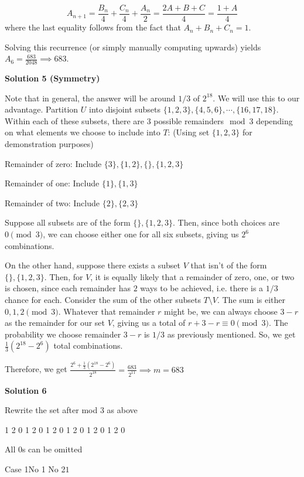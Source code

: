 \begin{enumerate}
 
 \[A_{n+1} = \frac{B_n}{4} + \frac{C_n}{4} + \frac{A_n}{2} = \frac{2A+B+C}{4} = \frac{1+A}{4}\]where the last equality follows from the fact that $A_n+B_n+C_n = 1.$

 Solving this recurrence (or simply manually computing upwards) yields $A_6 = \frac{683}{2048} \implies \boxed{683}$.

 



\textbf{Solution 5 (Symmetry)}

Note that in general, the answer will be around $1/3$ of $2^{18}$. We will use this to our advantage. Partition $U$ into disjoint subsets $\{1,2,3\}, \{4,5,6\}, \cdots, \{16,17,18\}$. Within each of these subsets, there are 3 possible remainders$\mod 3$ depending on what elements we choose to include into $T$: (Using set $\{1,2,3\}$ for demonstration purposes) 

 Remainder of zero: Include $\{3\}, \{1,2\}, \{\}, \{1,2,3\}$

 Remainder of one: Include $\{1\}, \{1,3\}$

 Remainder of two: Include $\{2\}, \{2,3\}$

 Suppose all subsets are of the form $\{\}, \{1,2,3\}$. Then, since both choices are $0 \pmod{3}$, we can choose either one for all six subsets, giving us $2^6$ combinations.

 On the other hand, suppose there exists a subset $V$ that isn't of the form $\{\}, \{1,2,3\}$. Then, for $V$, it is equally likely that a remainder of zero, one, or two is chosen, since each remainder has $2$ ways to be achieved, i.e. there is a $1/3$ chance for each. Consider the sum of the other subsets $T \setminus V$. The sum is either $0, 1, 2 \pmod{3}$. Whatever that remainder $r$ might be, we can always choose $3-r$ as the remainder for our set $V$, giving us a total of $r + 3 - r \equiv 0 \pmod{3}$. The probability we choose remainder $3-r$ is $1/3$ as previously mentioned. So, we get $\frac{1}{3}(2^{18} - 2^6)$ total combinations.

 Therefore, we get $\frac{2^6 + \frac{1}{3}(2^{18} - 2^6)}{2^{18}} = \frac{683}{2^{11}} \implies m = \boxed{683}$




\textbf{Solution 6}

Rewrite the set after mod 3 as above

 1 2 0 1 2 0 1 2 0 1 2 0 1 2 0 1 2 0

 All 0s can be omitted 

 Case 1No 1 No 2$1$


\end{enumerate}
